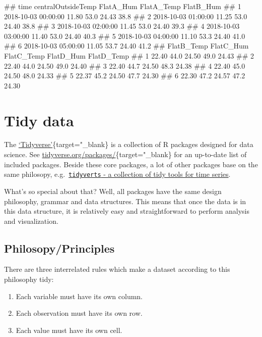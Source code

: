 \documentclass[
  a4paperpaper,
]{book}
\providecommand{\tightlist}{%
  \setlength{\itemsep}{0pt}\setlength{\parskip}{0pt}}
\let\oldverbatim\verbatim
\let\endoldverbatim\endverbatim
\renewenvironment{verbatim}{\footnotesize\oldverbatim}{\endoldverbatim}
\begin{document}
\begin{verbatim}
##                  time centralOutsideTemp FlatA_Hum FlatA_Temp FlatB_Hum
## 1 2018-10-03 00:00:00              11.80      53.0      24.43      38.8
## 2 2018-10-03 01:00:00              11.25      53.0      24.40      38.8
## 3 2018-10-03 02:00:00              11.45      53.0      24.40      39.3
## 4 2018-10-03 03:00:00              11.40      53.0      24.40      40.3
## 5 2018-10-03 04:00:00              11.10      53.3      24.40      41.0
## 6 2018-10-03 05:00:00              11.05      53.7      24.40      41.2
##   FlatB_Temp FlatC_Hum FlatC_Temp FlatD_Hum FlatD_Temp
## 1      22.40      44.0      24.50      49.0      24.43
## 2      22.40      44.0      24.50      49.0      24.40
## 3      22.40      44.7      24.50      48.3      24.38
## 4      22.40      45.0      24.50      48.0      24.33
## 5      22.37      45.2      24.50      47.7      24.30
## 6      22.30      47.2      24.57      47.2      24.30
\end{verbatim}

\hypertarget{tidy-data}{%
\chapter{Tidy data}\label{tidy-data}}

The \href{https://www.tidyverse.org/}{`Tidyverse'}\{target="\_blank\} is a collection of R packages designed for data science. See \href{https://www.tidyverse.org/packages/}{tidyverse.org/packages/}\{target="\_blank\} for an up-to-date list of included packages. Beside these core packages, a lot of other packages base on the same philosopy, e.g.~\href{https://tidyverts.org/}{\texttt{tidyverts} - a collection of tidy tools for time series}.

What's so special about that? Well, all packages have the same design philosophy, grammar and data structures. This means that once the data is in this data structure, it is relatively easy and straightforward to perform analysis and visualization.

\hypertarget{philosopyprinciples}{%
\section{Philosopy/Principles}\label{philosopyprinciples}}

There are three interrelated rules which make a dataset according to this philosophy tidy:

\begin{enumerate}
\def\labelenumi{\arabic{enumi}.}
\tightlist
\item
  Each variable must have its own column.
\item
  Each observation must have its own row.
\item
  Each value must have its own cell.
\end{enumerate}
\end{document}
